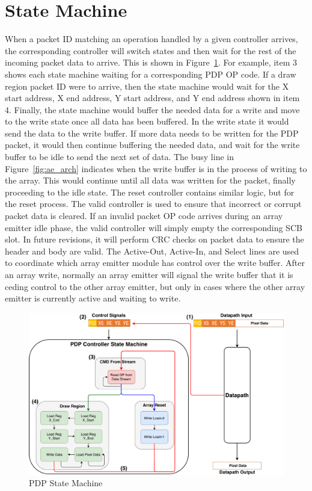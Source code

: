 \section{State Machine}
    When a packet ID matching an operation handled by a given controller arrives, the corresponding controller will switch states and then wait for the rest of the incoming packet data to arrive. This is shown in Figure~\ref{fig:state_machine}. For example, item 3 shows each state machine waiting for a corresponding PDP OP code. If a draw region packet ID were to arrive, then the state machine would wait for the X start address, X end address, Y start address, and Y end address shown in item 4. Finally, the state machine would buffer the needed data for a write and move to the write state once all data has been buffered. In the write state it would send the data to the write buffer. If more data needs to be written for the PDP packet, it would then continue buffering the needed data, and wait for the write buffer to be idle to send the next set of data. The busy line in Figure~\ref{fig:ae_arch} indicates when the write buffer is in the process of writing to the array. This would continue until all data was written for the packet, finally proceeding to the idle state. The reset controller contains similar logic, but for the reset process. The valid controller is used to ensure that incorrect or corrupt packet data is cleared. If an invalid packet OP code arrives during an array emitter idle phase, the valid controller will simply empty the corresponding SCB slot. In future revisions, it will perform CRC checks on packet data to ensure the header and body are valid. The Active-Out, Active-In, and Select lines are used to coordinate which array emitter module has control over the write buffer. After an array write, normally an array emitter will signal the write buffer that it is ceding control to the other array emitter, but only in cases where the other array emitter is currently active and waiting to write.

    \begin{figure}
        \centering
        \includegraphics[width=1.0\textwidth]{fig/pdp_state_machine.pdf}
        \caption{PDP State Machine}
        \label{fig:state_machine}
    \end{figure}
